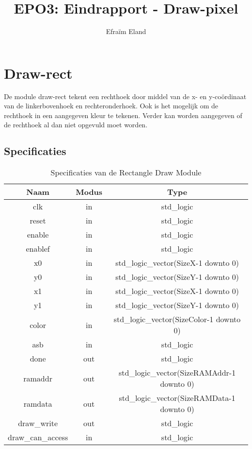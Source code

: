 \documentclass{scrartcl} %
\author{Efraïm Eland}%
\title{EPO3: Eindrapport - Draw-pixel}
\begin{document}
\section{Draw-rect} %
\label{sec:draw-rect}  %

\newcommand{\tss}{\textsubscript}

De module draw-rect tekent een rechthoek door middel van de x- en y-coördinaat van de linkerbovenhoek en rechteronderhoek. Ook is het mogelijk om de rechthoek in een aangegeven kleur te tekenen. Verder kan worden aangegeven of de rechthoek al dan niet opgevuld moet worden.

\subsection{Specificaties}

\begin{table}[H]
\centering
\caption{Specificaties van de Rectangle Draw Module}
\label{tab:spec-rect-draw}
\begin{tabular}{c c c}
	\hline\hline
 	Naam & Modus & Type\\
 	\hline	
	clk & in & std\_logic \\
	reset & in & std\_logic \\
	enable& in & std\_logic \\
	enablef& in & std\_logic\\
	x0 & in & std\_logic\_vector(SizeX-1 downto 0) \\
	y0 & in & std\_logic\_vector(SizeY-1 downto 0) \\
	x1 & in & std\_logic\_vector(SizeX-1 downto 0) \\
	y1 & in & std\_logic\_vector(SizeY-1 downto 0) \\
	color & in & std\_logic\_vector(SizeColor-1 downto 0) \\
	asb & in & std\_logic \\
	done & out & std\_logic \\
	ramaddr &out & std\_logic\_vector(SizeRAMAddr-1 downto 0) \\
	ramdata &out & std\_logic\_vector(SizeRAMData-1 downto 0) \\
	draw\_write &out & std\_logic \\
	draw\_can\_access & in & std\_logic \\
  	\hline
\end{tabular}
\end{table}
\end{document}
